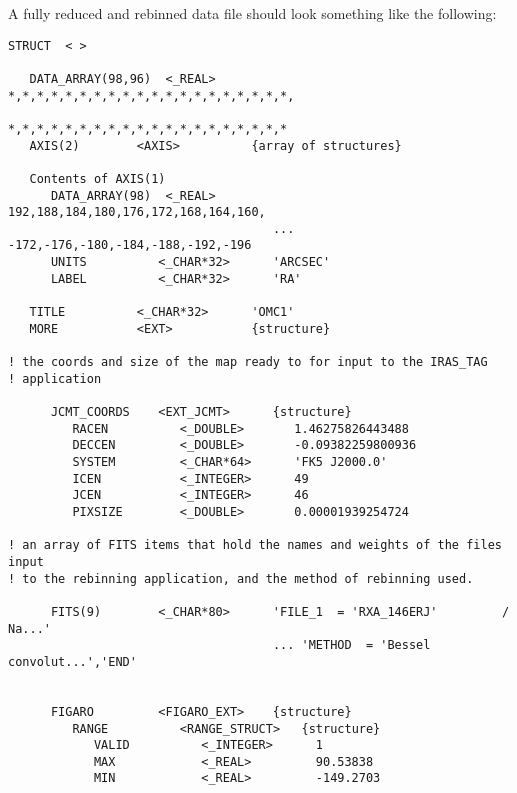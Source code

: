 \goodbreak

A fully reduced and rebinned data file should look something like the
following:

\begin{small}
\begin{verbatim}
STRUCT  < >

   DATA_ARRAY(98,96)  <_REAL>     *,*,*,*,*,*,*,*,*,*,*,*,*,*,*,*,*,*,*,*,
                                  *,*,*,*,*,*,*,*,*,*,*,*,*,*,*,*,*,*,*,*
   AXIS(2)        <AXIS>          {array of structures}

   Contents of AXIS(1)
      DATA_ARRAY(98)  <_REAL>        192,188,184,180,176,172,168,164,160,
                                     ... -172,-176,-180,-184,-188,-192,-196
      UNITS          <_CHAR*32>      'ARCSEC'
      LABEL          <_CHAR*32>      'RA'

   TITLE          <_CHAR*32>      'OMC1'
   MORE           <EXT>           {structure}

! the coords and size of the map ready to for input to the IRAS_TAG
! application

      JCMT_COORDS    <EXT_JCMT>      {structure}
         RACEN          <_DOUBLE>       1.46275826443488
         DECCEN         <_DOUBLE>       -0.09382259800936
         SYSTEM         <_CHAR*64>      'FK5 J2000.0'
         ICEN           <_INTEGER>      49
         JCEN           <_INTEGER>      46
         PIXSIZE        <_DOUBLE>       0.00001939254724

! an array of FITS items that hold the names and weights of the files input 
! to the rebinning application, and the method of rebinning used.

      FITS(9)        <_CHAR*80>      'FILE_1  = 'RXA_146ERJ'         / Na...'
                                     ... 'METHOD  = 'Bessel convolut...','END'


      FIGARO         <FIGARO_EXT>    {structure}
         RANGE          <RANGE_STRUCT>   {structure}
            VALID          <_INTEGER>      1
            MAX            <_REAL>         90.53838
            MIN            <_REAL>         -149.2703
\end{verbatim}
\end{small}


